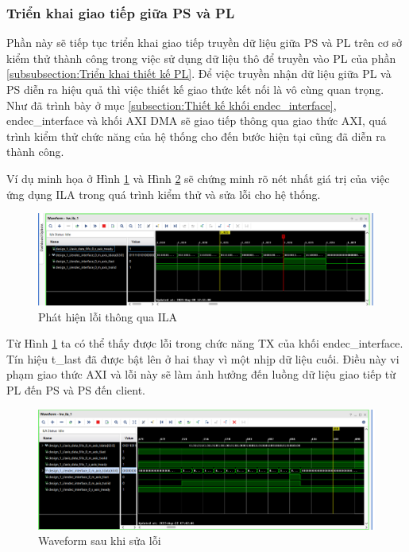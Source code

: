 \documentclass[../DoAn.tex]{subfiles}
\begin{document}
\subsubsection{Triển khai giao tiếp giữa PS và PL}

Phần này sẽ tiếp tục triển khai giao tiếp truyền dữ liệu giữa PS và PL trên cơ sở kiểm thử thành công trong việc sử dụng dữ liệu thô để truyền vào PL của phần \ref{subsubsection:Triển khai thiết kế PL}. Để việc truyền nhận dữ liệu giữa PL và PS diễn ra hiệu quả thì việc thiết kế giao thức kết nối là vô cùng quan trọng. Như đã trình bày ở mục \ref{subsection:Thiết kế khối endec_interface}, endec\_interface và khối AXI DMA sẽ giao tiếp thông qua giao thức AXI, quá trình kiểm thử chức năng của hệ thống cho đến bước hiện tại cũng đã diễn ra thành công. 

Ví dụ minh họa ở Hình \ref{fig:Phát hiện lỗi thông qua ILA} và Hình \ref{fig:Waveform sau khi sửa lỗi} sẽ chứng minh rõ nét nhất giá trị của việc ứng dụng ILA trong quá trình kiểm thử và sửa lỗi cho hệ thống.

\begin{figure}[H]
    \centering
    \includegraphics[width=\textwidth, height=0.33\textheight, keepaspectratio]{Hinhve/Chuong 4/ILA bug.png}
    \caption{Phát hiện lỗi thông qua ILA}
    \label{fig:Phát hiện lỗi thông qua ILA}
\end{figure}

Từ Hình \ref{fig:Phát hiện lỗi thông qua ILA} ta có thể thấy được lỗi trong chức năng TX của khối endec\_interface. Tín hiệu t\_last đã được bật lên ở hai thay vì một nhịp dữ liệu cuối. Điều này vi phạm giao thức AXI và lỗi này sẽ làm ảnh hưởng đến luồng dữ liệu giao tiếp từ PL đến PS và PS đến client.

\begin{figure}[H]
    \centering
    \includegraphics[width=\textwidth, height=0.33\textheight, keepaspectratio]{Hinhve/Chuong 4/ILA debug.png}
    \caption{Waveform sau khi sửa lỗi}
    \label{fig:Waveform sau khi sửa lỗi}
\end{figure}
\end{document}
